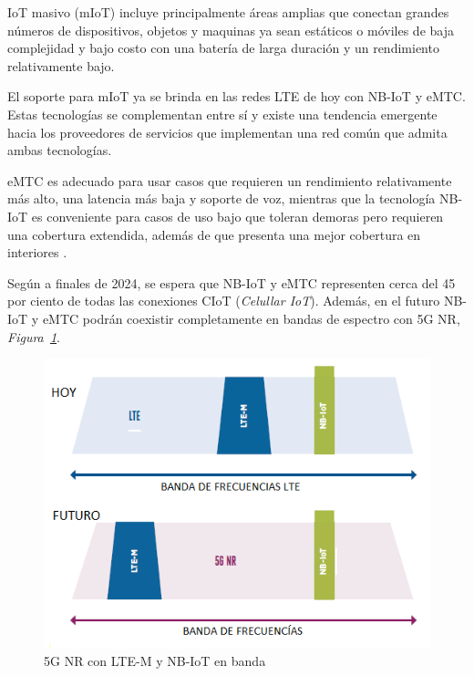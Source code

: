 IoT masivo (mIoT) incluye principalmente áreas amplias que conectan grandes números de dispositivos, objetos y maquinas ya sean estáticos o móviles de baja complejidad y bajo costo con una batería de larga duración y un rendimiento relativamente bajo. \newline

El soporte para mIoT ya se brinda en las redes LTE de hoy con NB-IoT y eMTC. Estas tecnologías se complementan entre sí y existe una tendencia emergente hacia los proveedores de servicios que implementan una red común que admita ambas tecnologías.\newline

eMTC es adecuado para usar casos que requieren un rendimiento relativamente más alto, una latencia más baja y soporte de voz, mientras que la tecnología NB-IoT es conveniente para casos de uso bajo que toleran demoras pero requieren una cobertura extendida, además de que presenta una mejor cobertura en interiores \parencite{EricssonAB2016}. \newline

Según \parencite{Ericsson2019} a finales de 2024, se espera que NB-IoT y eMTC representen cerca del 45 por ciento de todas las conexiones CIoT (\textit{Celullar IoT}). Además, en el futuro NB-IoT y eMTC podrán coexistir completamente en bandas de espectro con 5G NR, \textit{Figura~\ref{fig:5gnr}}.\newline

\begin{figure}[th]
\centering
\includegraphics[scale=1]{Figures/5G NR con LTE-M y NB-IoT en banda}
\decoRule
\caption[5G NR con LTE-M y NB-IoT en banda]{5G NR con LTE-M y NB-IoT en banda}
\label{fig:5gnr}
\end{figure}

